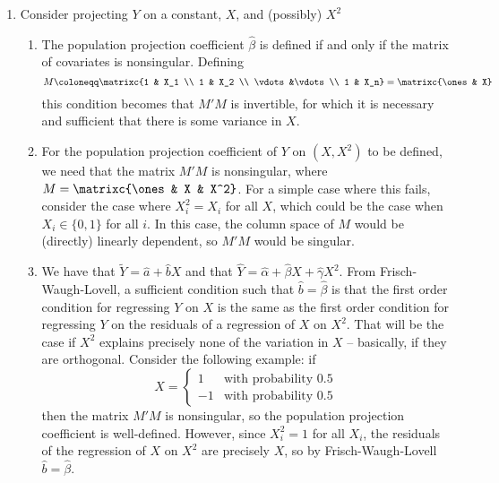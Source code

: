 \documentclass[10pt]{article}
\begin{document}
\begin{enumerate}
	\item Consider projecting $Y$ on a constant, $X$, and (possibly) $X^2$ \begin{enumerate} \item The population projection coefficient $\hat{\beta}$ is defined if and only if the matrix of covariates is nonsingular. Defining \[M \coloneqq \matrixc{1 & X_1 \\ 1 & X_2 \\ \vdots &\vdots \\ 1 & X_n} = \matrixc{\ones & X}\] this condition becomes that $M'M$ is invertible, for which it is necessary and sufficient that there is some variance in $X$. \item For the population projection coefficient of $Y$ on $(X,X^2)$ to be defined, we need that the matrix $M'M$ is nonsingular, where $M = \matrixc{\ones & X & X^2}$. For a simple case where this fails, consider the case where $X_i^2 = X_i$ for all $X$, which could be the case when $X_i \in \{0,1\}$ for all $i$. In this case, the column space of $M$ would be (directly) linearly dependent, so $M'M$ would be singular. \item We have that $\tilde{Y} = \hat{a} + \hat{b}X$ and that $\hat{Y} = \hat{\alpha} + \hat{\beta}X + \hat{\gamma}X^2 $. From Frisch-Waugh-Lovell, a sufficient condition such that $\hat{b} = \hat{\beta}$ is that the first order condition for regressing $Y$ on $X$ is the same as the first order condition for regressing $Y$ on the residuals of a regression of $X$ on $X^2$. That will be the case if $X^2$ explains precisely none of the variation in $X$ -- basically, if they are orthogonal. Consider the following example: if \[X = \begin{cases} 1 & \text{with probability } 0.5 \\ -1 & \text{with probability }0.5\end{cases}\]then the matrix $M'M$ is nonsingular, so the population projection coefficient is well-defined. However, since $X_i^2 = 1$ for all $X_i$, the residuals of the regression of $X$ on $X^2$ are precisely $X$, so by Frisch-Waugh-Lovell $\hat{b} = \hat{\beta}$. \end{enumerate}
\end{enumerate}
\end{document}
